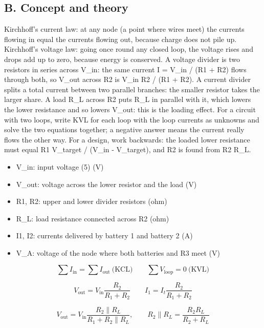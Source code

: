 \documentclass[11pt,a4paper]{article}
\begin{document}
\subsection*{B. Concept and theory}
Kirchhoff's current law: at any node (a point where wires meet) the currents flowing in equal the currents flowing out, because charge does not pile up. Kirchhoff's voltage law: going once round any closed loop, the voltage rises and drops add up to zero, because energy is conserved. A voltage divider is two resistors in series across V\_in: the same current I = V\_in / (R1 + R2) flows through both, so V\_out across R2 is V\_in R2 / (R1 + R2). A current divider splits a total current between two parallel branches: the smaller resistor takes the larger share. A load R\_L across R2 puts R\_L in parallel with it, which lowers the lower resistance and so lowers V\_out: this is the loading effect. For a circuit with two loops, write KVL for each loop with the loop currents as unknowns and solve the two equations together; a negative answer means the current really flows the other way. For a design, work backwards: the loaded lower resistance must equal R1 V\_target / (V\_in - V\_target), and R2 is found from R2 \textbar{}\textbar{} R\_L.

\begin{itemize}[nosep]
\item V\_in: input voltage (5) (V)
\item V\_out: voltage across the lower resistor and the load (V)
\item R1, R2: upper and lower divider resistors (ohm)
\item R\_L: load resistance connected across R2 (ohm)
\item I1, I2: currents delivered by battery 1 and battery 2 (A)
\item V\_A: voltage of the node where both batteries and R3 meet (V)
\end{itemize}

\begin{equation*}
\sum I_{\mathrm{in}}=\sum I_{\mathrm{out}}\ \text{(KCL)}\qquad \sum V_{\mathrm{loop}}=0\ \text{(KVL)}
\end{equation*}

\begin{equation*}
V_{\mathrm{out}}=V_{\mathrm{in}}\frac{R_2}{R_1+R_2}\qquad I_1=I_t\frac{R_2}{R_1+R_2}
\end{equation*}

\begin{equation*}
V_{\mathrm{out}}=V_{\mathrm{in}}\frac{R_2\parallel R_L}{R_1+R_2\parallel R_L},\qquad R_2\parallel R_L=\frac{R_2R_L}{R_2+R_L}
\end{equation*}
\end{document}
